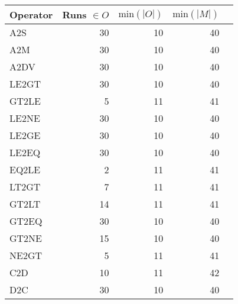 \begin{tabular}{lrrrr}
    \toprule
    Operator & Runs $\in O$ & $\text{min}(|O|)$ & $\text{min}(|M|)$ \\
            \midrule
            A2S & 30 & 10 & 40 \\
            A2M & 30 & 10 & 40 \\
            A2DV & 30 & 10 & 40 \\
            \midrule
            LE2GT & 30 & 10 & 40 \\
            GT2LE & 5 & 11 & 41 \\
            LE2NE & 30 & 10 & 40 \\
            LE2GE & 30 & 10 & 40 \\
            LE2EQ & 30 & 10 & 40 \\
            EQ2LE & 2 & 11 & 41 \\
            LT2GT & 7 & 11 & 41 \\
            GT2LT & 14 & 11 & 41 \\
            GT2EQ & 30 & 10 & 40 \\
            GT2NE & 15 & 10 & 40 \\
            NE2GT & 5 & 11 & 41 \\
            \midrule
            C2D & 10 & 11 & 42 \\
            D2C & 30 & 10 & 40 \\
    \bottomrule
\end{tabular}
